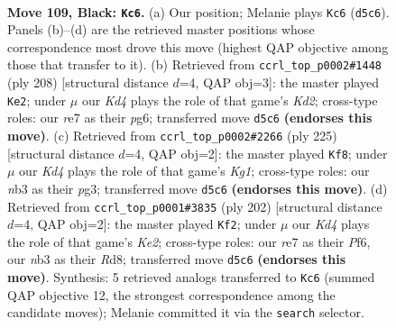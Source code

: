 \documentclass[11pt]{article}
\begin{document}
\clearpage

\begin{figure}[p]\centering
\begin{subfigure}{0.46\textwidth}\centering
\resizebox{\linewidth}{!}{%
\newchessgame
\chessboard[
  setfen={8/4R3/8/3k4/5KP1/1N6/7r/8 b - - 2 109},
  showmover=false,
  pgfstyle=straightmove, color=movearrow, markmove={d5-c6}
]}
\caption{}
\end{subfigure}\hfill
\begin{subfigure}{0.46\textwidth}\centering
\resizebox{\linewidth}{!}{%
\newchessgame
\chessboard[
  setfen={8/6n1/6p1/8/6k1/6p1/3K4/5R2 w - - 12 105},
  showmover=false,
  pgfstyle=straightmove, color=movearrow, markmove={d2-e2}
]}
\caption{}
\end{subfigure}
\\[4pt]
\begin{subfigure}{0.46\textwidth}\centering
\resizebox{\linewidth}{!}{%
\newchessgame
\chessboard[
  setfen={6k1/1R6/r7/6PK/8/6P1/8/8 b - - 22 113},
  showmover=false,
  pgfstyle=straightmove, color=movearrow, markmove={g8-f8}
]}
\caption{}
\end{subfigure}\hfill
\begin{subfigure}{0.46\textwidth}\centering
\resizebox{\linewidth}{!}{%
\newchessgame
\chessboard[
  setfen={3R4/r7/5P2/8/5kp1/8/4K3/8 w - - 2 102},
  showmover=false,
  pgfstyle=straightmove, color=movearrow, markmove={e2-f2}
]}
\caption{}
\end{subfigure}
\caption{\textbf{Move 109, Black: \texttt{Kc6}.} (a) Our position; Melanie plays \texttt{Kc6} (\texttt{d5c6}). Panels (b)--(d) are the retrieved master positions whose correspondence most drove this move (highest QAP objective among those that transfer to it). (b) Retrieved from \texttt{ccrl\_top\_p0002\#1448} (ply 208) [structural distance $d$=4, QAP obj=3]: the master played \texttt{Ke2}; under $\mu$ our \emph{Kd4} plays the role of that game's \emph{Kd2}; cross-type roles: our \emph{r}e7 as their \emph{p}g6; transferred move \texttt{d5c6} \textbf{(endorses this move)}. (c) Retrieved from \texttt{ccrl\_top\_p0002\#2266} (ply 225) [structural distance $d$=4, QAP obj=2]: the master played \texttt{Kf8}; under $\mu$ our \emph{Kd4} plays the role of that game's \emph{Kg1}; cross-type roles: our \emph{n}b3 as their \emph{p}g3; transferred move \texttt{d5c6} \textbf{(endorses this move)}. (d) Retrieved from \texttt{ccrl\_top\_p0001\#3835} (ply 202) [structural distance $d$=4, QAP obj=2]: the master played \texttt{Kf2}; under $\mu$ our \emph{Kd4} plays the role of that game's \emph{Ke2}; cross-type roles: our \emph{r}e7 as their \emph{P}f6, our \emph{n}b3 as their \emph{R}d8; transferred move \texttt{d5c6} \textbf{(endorses this move)}. Synthesis: 5 retrieved analogs transferred to \texttt{Kc6} (summed QAP objective 12, the strongest correspondence among the candidate moves); Melanie committed it via the \texttt{search} selector.}
\label{fig:thought-m217}
\end{figure}
\end{document}

